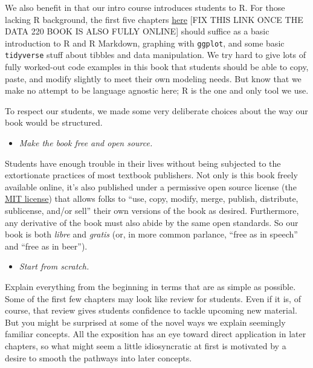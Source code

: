 \documentclass[
]{book}
\providecommand{\tightlist}{%
  \setlength{\itemsep}{0pt}\setlength{\parskip}{0pt}}
\begin{document}
We also benefit in that our intro course introduces students to R. For those lacking R background, the first five chapters \href{https://github.com/VectorPosse/Intro_Stats}{here} {[}FIX THIS LINK ONCE THE DATA 220 BOOK IS ALSO FULLY ONLINE{]} should suffice as a basic introduction to R and R Markdown, graphing with \texttt{ggplot}, and some basic \texttt{tidyverse} stuff about tibbles and data manipulation. We try hard to give lots of fully worked-out code examples in this book that students should be able to copy, paste, and modify slightly to meet their own modeling needs. But know that we make no attempt to be language agnostic here; R is the one and only tool we use.

To respect our students, we made some very deliberate choices about the way our book would be structured.

\begin{itemize}
\tightlist
\item
  \emph{Make the book free and open source.}
\end{itemize}

Students have enough trouble in their lives without being subjected to the extortionate practices of most textbook publishers. Not only is this book freely available online, it's also published under a permissive open source license (the \href{https://opensource.org/licenses/MIT}{MIT license}) that allows folks to ``use, copy, modify, merge, publish, distribute, sublicense, and/or sell'' their own versions of the book as desired. Furthermore, any derivative of the book must also abide by the same open standards. So our book is both \emph{libre} and \emph{gratis} (or, in more common parlance, ``free as in speech'' and ``free as in beer'').

\begin{itemize}
\tightlist
\item
  \emph{Start from scratch.}
\end{itemize}

Explain everything from the beginning in terms that are as simple as possible. Some of the first few chapters may look like review for students. Even if it is, of course, that review gives students confidence to tackle upcoming new material. But you might be surprised at some of the novel ways we explain seemingly familiar concepts. All the exposition has an eye toward direct application in later chapters, so what might seem a little idiosyncratic at first is motivated by a desire to smooth the pathways into later concepts.
\end{document}
